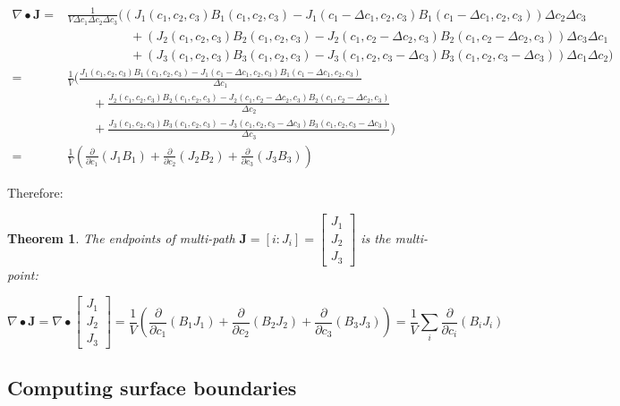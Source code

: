 \documentclass{book}
\newtheorem{thm}{Theorem}
\begin{document}
\begin{align*}
\nabla \bullet \mathbf{J} = & \frac{1}{V \Delta c_1 \Delta c_2 \Delta c_3}\bigg((J_1(c_1,c_2,c_3) B_1(c_1, c_2, c_3) - J_1(c_1 - \Delta c_1,c_2,c_3) B_1(c_1 - \Delta c_1, c_2, c_3))\Delta c_2 \Delta c_3 \\
& \quad\quad\quad\quad\quad + (J_2(c_1,c_2,c_3) B_2(c_1, c_2, c_3) - J_2(c_1,c_2 - \Delta c_2,c_3) B_2(c_1, c_2 - \Delta c_2, c_3)) \Delta c_3 \Delta c_1 \\ 
& \quad\quad\quad\quad\quad + (J_3(c_1,c_2,c_3) B_3(c_1, c_2, c_3) - J_3(c_1,c_2,c_3 - \Delta c_3) B_3(c_1, c_2, c_3 - \Delta c_3)) \Delta c_1 \Delta c_2 \bigg) \\
= & \frac{1}{V}\bigg(\frac{J_1(c_1,c_2,c_3) B_1(c_1, c_2, c_3) - J_1(c_1 - \Delta c_1,c_2,c_3) B_1(c_1 - \Delta c_1, c_2, c_3)}{\Delta c_1} \\
& \quad\quad + \frac{J_2(c_1,c_2,c_3) B_2(c_1, c_2, c_3) - J_2(c_1,c_2 - \Delta c_2,c_3) B_2(c_1, c_2 - \Delta c_2, c_3)}{\Delta c_2} \\ 
& \quad\quad + \frac{J_3(c_1,c_2,c_3) B_3(c_1, c_2, c_3) - J_3(c_1,c_2,c_3 - \Delta c_3) B_3(c_1, c_2, c_3 - \Delta c_3)}{\Delta c_3}\bigg) \\
= & \frac{1}{V}\left(\frac{\partial}{\partial c_1}(J_1 B_1) + \frac{\partial}{\partial c_2}(J_2 B_2) + \frac{\partial}{\partial c_3}(J_3 B_3)\right)
\end{align*}

Therefore:
\begin{thm}
The endpoints of multi-path \(\mathbf{J} = [i : J_i] = \begin{bmatrix} J_1 \\ J_2 \\ J_3 \end{bmatrix}\) is the multi-point:

\[\nabla \bullet \mathbf{J} = \nabla \bullet \begin{bmatrix} J_1 \\ J_2 \\ J_3 \end{bmatrix} = \frac{1}{V}\left(\frac{\partial}{\partial c_1}(B_1 J_1) + \frac{\partial}{\partial c_2}(B_2 J_2) + \frac{\partial}{\partial c_3}(B_3 J_3)\right) = \frac{1}{V}\sum_i \frac{\partial}{\partial c_i} (B_i J_i)\]
\end{thm}



\subsection*{Computing surface boundaries}
\end{document}
